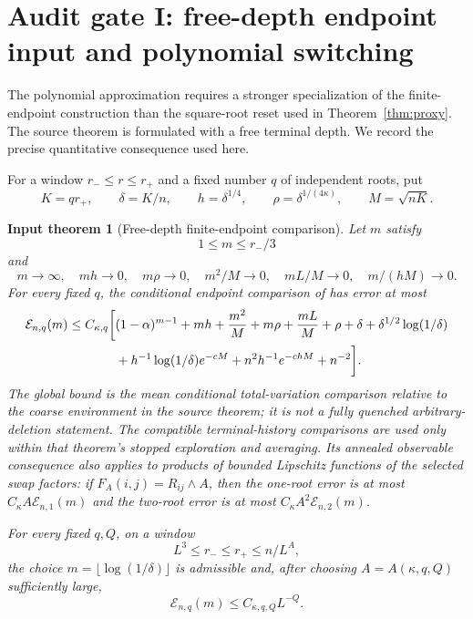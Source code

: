 \documentclass[11pt]{article}
\newtheorem{inputtheorem}[theorem]{Input theorem}
\theoremstyle{remark}
\begin{document}
\section{Audit gate I: free-depth endpoint input and polynomial switching}
\label{sec:free-depth-gate}

The polynomial approximation requires a stronger specialization of the
finite-endpoint construction than the square-root reset used in
Theorem~\ref{thm:proxy}.  The source theorem is formulated with a free
terminal depth.  We record the precise quantitative consequence used here.

For a window $r_-\le r\le r_+$ and a fixed number $q$ of independent roots,
put
\[
 K=qr_+,
 \qquad
 \delta=K/n,
 \qquad
 h=\delta^{1/4},
 \qquad
 \rho=\delta^{1/(4\kappa)},
 \qquad
 M=\sqrt{nK}.
\]

\begin{inputtheorem}[Free-depth finite-endpoint comparison]
\label{input:free-depth}
Let $m$ satisfy
\[
 1\le m\le r_-/3
\]
and
\[
 m\to\infty,
 \quad mh\to0,
 \quad m\rho\to0,
 \quad m^2/M\to0,
 \quad mL/M\to0,
 \quad m/(hM)\to0.
\]
For every fixed $q$, the conditional endpoint comparison of
\cite{LongSwitch2026} has error at most
\begin{align}
 \mathcal E_{n,q}(m)\le C_{\kappa,q}\bigg[&
 (1-\alpha)^{m-1}+mh+\frac{m^2}{M}+m\rho+\frac{mL}{M}
 +\rho+\delta+\delta^{1/2}\log(1/\delta)
 \notag\\
 &+h^{-1}\log(1/\delta)e^{-cM}
 +n^2h^{-1}e^{-chM}+n^{-2}\bigg].
 \label{eq:free-depth-input-error}
\end{align}
The global bound is the mean conditional total-variation comparison relative
to the coarse environment in the source theorem; it is not a fully quenched
arbitrary-deletion statement. The compatible terminal-history comparisons
are used only within that theorem's stopped exploration and averaging.
Its annealed observable consequence also applies to products of bounded
Lipschitz functions of the selected swap factors: if $F_A(i,j)=R_{ij}\wedge A$, then the one-root error
is at most $C_\kappa A\mathcal E_{n,1}(m)$ and the two-root error is at most
$C_\kappa A^2\mathcal E_{n,2}(m)$.

For every fixed $q,Q$, on a window
\[
 L^3\le r_-\le r_+\le n/L^A,
\]
the choice $m=\lfloor\log(1/\delta)\rfloor$ is admissible and, after choosing
$A=A(\kappa,q,Q)$ sufficiently large,
\[
 \mathcal E_{n,q}(m)\le C_{\kappa,q,Q}L^{-Q}.
\]
\end{inputtheorem}
\end{document}
